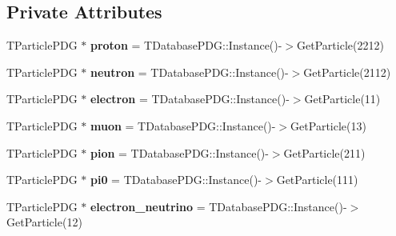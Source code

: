 \subsection*{Private Attributes}
\begin{DoxyCompactItemize}
\item 
T\+Particle\+P\+DG $\ast$ {\bfseries proton} = T\+Database\+P\+D\+G\+::\+Instance()-\/$>$Get\+Particle(2212)\hypertarget{classanalysis_1_1DefaultAnalysis_a93050a6176a0497f73a16db74a686c53}{}\label{classanalysis_1_1DefaultAnalysis_a93050a6176a0497f73a16db74a686c53}

\item 
T\+Particle\+P\+DG $\ast$ {\bfseries neutron} = T\+Database\+P\+D\+G\+::\+Instance()-\/$>$Get\+Particle(2112)\hypertarget{classanalysis_1_1DefaultAnalysis_a82cdc332e30f34fd12ec5493808cc28c}{}\label{classanalysis_1_1DefaultAnalysis_a82cdc332e30f34fd12ec5493808cc28c}

\item 
T\+Particle\+P\+DG $\ast$ {\bfseries electron} = T\+Database\+P\+D\+G\+::\+Instance()-\/$>$Get\+Particle(11)\hypertarget{classanalysis_1_1DefaultAnalysis_a1089802dee9a5e84c00e7e007dde2746}{}\label{classanalysis_1_1DefaultAnalysis_a1089802dee9a5e84c00e7e007dde2746}

\item 
T\+Particle\+P\+DG $\ast$ {\bfseries muon} = T\+Database\+P\+D\+G\+::\+Instance()-\/$>$Get\+Particle(13)\hypertarget{classanalysis_1_1DefaultAnalysis_a497f1c0211f19df2985b622a4c536933}{}\label{classanalysis_1_1DefaultAnalysis_a497f1c0211f19df2985b622a4c536933}

\item 
T\+Particle\+P\+DG $\ast$ {\bfseries pion} = T\+Database\+P\+D\+G\+::\+Instance()-\/$>$Get\+Particle(211)\hypertarget{classanalysis_1_1DefaultAnalysis_a8eefb85a44d77ee187587fb687edda77}{}\label{classanalysis_1_1DefaultAnalysis_a8eefb85a44d77ee187587fb687edda77}

\item 
T\+Particle\+P\+DG $\ast$ {\bfseries pi0} = T\+Database\+P\+D\+G\+::\+Instance()-\/$>$Get\+Particle(111)\hypertarget{classanalysis_1_1DefaultAnalysis_a01ede37c4c112f9fd8e4bd4e0b33d123}{}\label{classanalysis_1_1DefaultAnalysis_a01ede37c4c112f9fd8e4bd4e0b33d123}

\item 
T\+Particle\+P\+DG $\ast$ {\bfseries electron\+\_\+neutrino} = T\+Database\+P\+D\+G\+::\+Instance()-\/$>$Get\+Particle(12)\hypertarget{classanalysis_1_1DefaultAnalysis_adba116e53c02e5f2de721bc7a7eb909e}{}\label{classanalysis_1_1DefaultAnalysis_adba116e53c02e5f2de721bc7a7eb909e}


\end{DoxyCompactItemize}

